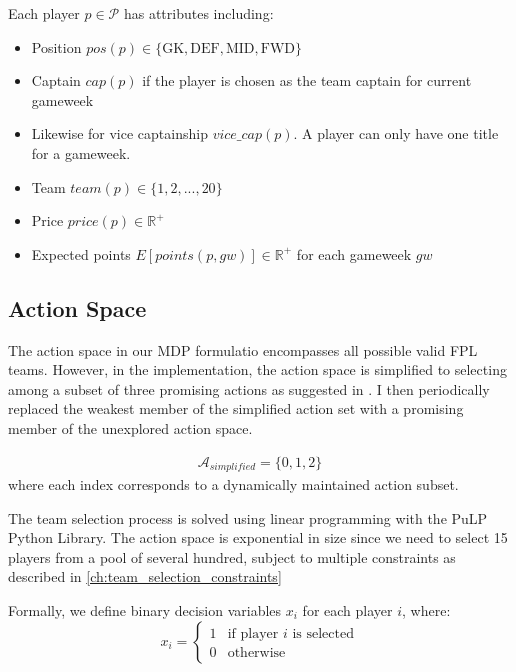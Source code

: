 Each player $p \in \mathcal{P}$ has attributes including:
\begin{itemize}
    \item Position $pos(p) \in \{\text{GK}, \text{DEF}, \text{MID}, \text{FWD}\}$
    \item Captain $cap(p)$ if the player is chosen as the team captain for current gameweek
    \item Likewise for vice captainship $vice\_cap(p)$. A player can only have one title for a gameweek.
    \item Team $team(p) \in \{1, 2, ..., 20\}$ 
    \item Price $price(p) \in \mathbb{R}^+$
    \item Expected points $E[points(p, gw)] \in \mathbb{R}^+$ for each gameweek $gw$
\end{itemize}

\subsection{Action Space} \label{action_space}
The action space in our MDP formulatio encompasses all possible valid FPL teams.
However, in the implementation, the action space is simplified to selecting among a subset of three promising actions as suggested in \cite{matthews2012}. I then periodically replaced the weakest member of the simplified action set with a promising member of the unexplored action space.

\begin{align}
\mathcal{A}_{simplified} = \{0, 1, 2\}
\end{align}
where each index corresponds to a dynamically maintained action subset.

The team selection process is solved using linear programming with the PuLP Python Library. The action space is exponential in size since we need to select 15 players from a pool of several hundred, subject to multiple constraints as described in \ref{ch:team_selection_constraints}

Formally, we define binary decision variables $x_i$ for each player $i$, where:
\begin{equation}
    x_i =
    \begin{cases}
        1 & \text{if player $i$ is selected} \\
        0 & \text{otherwise}
    \end{cases}
\end{equation}

